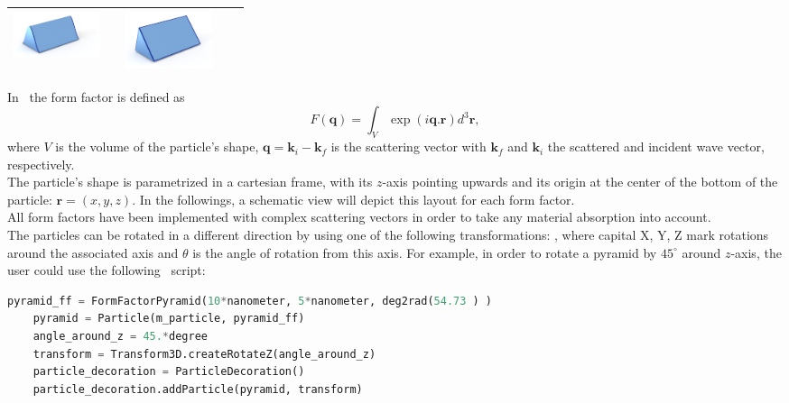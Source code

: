 \begin{table}[H]
\begin{tabulary} {0.95\textwidth}{Lc Lc L}
\includegraphics[width=1in]{Figures/Ripple13d} &
& \includegraphics[width=1in]{Figures/Ripple23d}  \\
\hline 
\end{tabulary}
\end{table}

In \BornAgain\ the form factor is defined as
\begin{equation}
F(\mathbf{q})=\int_V \exp (i\mathbf{q}.\mathbf{r}) d^3 \mathbf{r},
\label{ffformulaBA}
\end{equation}
where $V$ is the volume of the particle's shape,
$\mathbf{q}=\mathbf{k}_i - \mathbf{k}_f$ is the scattering vector with
$\mathbf{k}_f$ and $\mathbf{k}_i$ the scattered and incident wave
vector, respectively.\\

The particle's shape is parametrized in a cartesian frame, with its
$z$-axis pointing upwards and its origin at the center of the bottom
of the particle: $\mathbf{r}=(x,y,z)$. In the followings, a schematic view will depict this layout for each
form factor.\\


All form factors have been implemented with complex scattering vectors
in order to take any material absorption into account.\\


The particles can be rotated in a different direction by using one of
the following transformations: , where capital X, Y, Z mark rotations
around the associated axis and $\theta$ is the
angle of rotation from this axis. For example, in order to rotate a pyramid by $45^{\circ}$ around
$z$-axis, the user could use the following \ script:\\

\begin{lstlisting}[language=python, style=eclipseboxed,numbers=none,nolol]
    pyramid_ff = FormFactorPyramid(10*nanometer, 5*nanometer, deg2rad(54.73 ) )
    pyramid = Particle(m_particle, pyramid_ff)
    angle_around_z = 45.*degree
    transform = Transform3D.createRotateZ(angle_around_z)
    particle_decoration = ParticleDecoration()
    particle_decoration.addParticle(pyramid, transform) 
\end{lstlisting}

